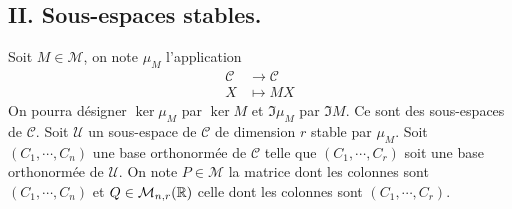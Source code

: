 \subsection*{II. Sous-espaces stables.}
Soit $M\in \mathcal{M}$, on note $\mu_M$ l'application
\[
 \begin{aligned}
  \mathcal{C} &\rightarrow \mathcal{C} \\ X &\mapsto MX
 \end{aligned}
\]
On pourra désigner $\ker \mu_M$ par $\ker M$ et $\Im \mu_M$ par $\Im M$. Ce sont des sous-espaces de $\mathcal{C}$.\newline 
Soit $\mathcal{U}$ un sous-espace de $\mathcal{C}$ de dimension $r$ stable par $\mu_M$.\newline
Soit $(C_1, \cdots, C_n)$ une base orthonormée de $\mathcal{C}$ telle que $(C_1, \cdots, C_r)$ soit une base orthonormée de $\mathcal{U}$.\newline
On note $P \in \mathcal{M}$ la matrice dont les colonnes sont $(C_1, \cdots, C_n)$ et $Q \in \mathcal{M}_{n,r}(\mathbb{R})$ celle dont les colonnes sont $(C_1, \cdots, C_r)$.
